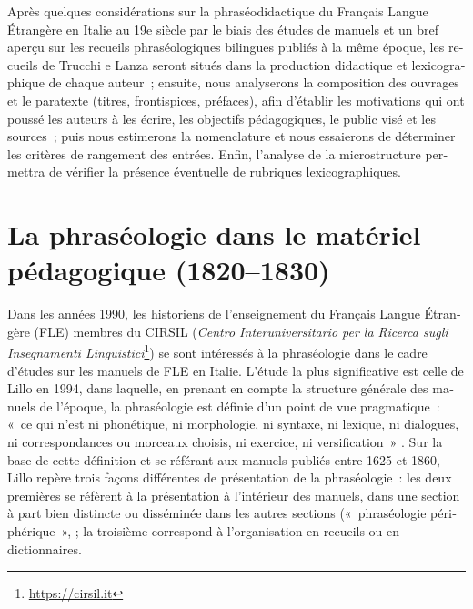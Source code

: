 \documentclass[output=paper,booklanguage=french]{langscibook}
\begin{document}
\begin{otherlanguage}{french}
Après quelques considérations sur la phraséodidactique du Français Langue Étrangère en Italie au 19e siècle par le biais des études de manuels et un bref aperçu sur les recueils phraséologiques bilingues publiés à la même époque, les recueils de Trucchi e Lanza seront situés dans la production didactique et lexicographique de chaque auteur~; ensuite, nous analyserons la composition des ouvrages et le paratexte (titres, frontispices, préfaces), afin d’établir les motivations qui ont poussé les auteurs à les écrire, les objectifs pédagogiques, le public visé et les sources~; puis nous estimerons la nomenclature et nous essaierons de déterminer les critères de rangement des entrées. Enfin, l’analyse de la microstructure permettra de vérifier la présence éventuelle de rubriques lexicographiques.

\section{La phraséologie dans le matériel pédagogique (1820--1830)}

Dans les années 1990, les historiens de l’enseignement du Français Langue Étrangère (FLE) membres du CIRSIL (\emph{Centro Interuniversitario per la Ricerca sugli Insegnamenti Linguistici}\footnote{\url{https://cirsil.it}}) se sont intéressés à la phraséologie dans le cadre d’études sur les manuels de FLE en Italie. L’étude la plus significative est celle de Lillo en 1994, dans laquelle, en prenant en compte la structure générale des manuels de l’époque, la phraséologie est définie d’un point de vue pragmatique~: «~ce qui n’est ni phonétique, ni morphologie, ni syntaxe, ni lexique, ni dialogues, ni correspondances ou morceaux choisis, ni exercice, ni versification~» \citep[70--71]{Lillo1994}. Sur la base de cette définition et se référant aux manuels publiés entre 1625 et 1860, Lillo repère trois façons différentes de présentation de la phraséologie~: les deux premières se réfèrent à la présentation à l’intérieur des manuels, dans une section à part bien distincte ou disséminée dans les autres sections («~phraséologie périphérique~», \citep[71]{Lillo1994}; la troisième correspond à l’organisation en recueils ou en dictionnaires.


\end{otherlanguage}
\end{document}
